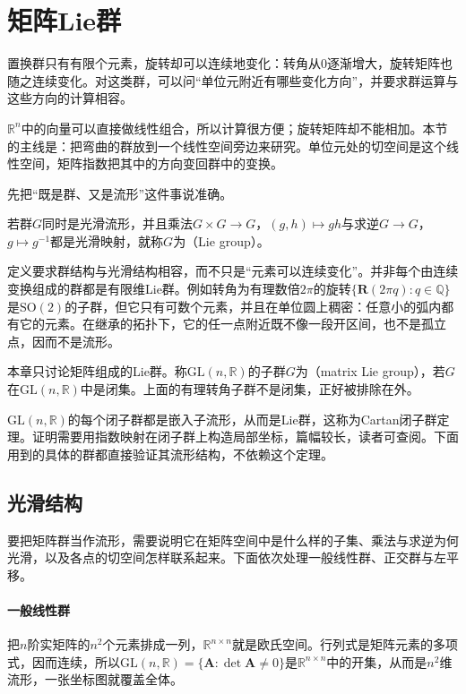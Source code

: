 \section{矩阵Lie群}
\label{sec:lie-matrix-groups}

置换群只有有限个元素，旋转却可以连续地变化：转角从$0$逐渐增大，旋转矩阵也随之连续变化。对这类群，可以问“单位元附近有哪些变化方向”，并要求群运算与这些方向的计算相容。

$\mathbb R^n$中的向量可以直接做线性组合，所以计算很方便；旋转矩阵却不能相加。本节的主线是：把弯曲的群放到一个线性空间旁边来研究。单位元处的切空间是这个线性空间，矩阵指数把其中的方向变回群中的变换。

先把“既是群、又是流形”这件事说准确。

\begin{definition}[Lie群]
\label{def:lie-lie-group}
若群$G$同时是光滑流形，并且乘法$G\times G\to G$，$(g,h)\mapsto gh$与求逆$G\to G$，$g\mapsto g^{-1}$都是光滑映射，就称$G$为（Lie group）。
\end{definition}

定义要求群结构与光滑结构相容，而不只是“元素可以连续变化”。并非每个由连续变换组成的群都是有限维Lie群。例如转角为有理数倍$2\pi$的旋转$\{\bm R(2\pi q):q\in\mathbb Q\}$是$\mathrm{SO}(2)$的子群，但它只有可数个元素，并且在单位圆上稠密：任意小的弧内都有它的元素。在继承的拓扑下，它的任一点附近既不像一段开区间，也不是孤立点，因而不是流形。

本章只讨论矩阵组成的Lie群。称$\mathrm{GL}(n,\mathbb R)$的子群$G$为（matrix Lie group），若$G$在$\mathrm{GL}(n,\mathbb R)$中是闭集。上面的有理转角子群不是闭集，正好被排除在外。

$\mathrm{GL}(n,\mathbb R)$的每个闭子群都是嵌入子流形，从而是Lie群，这称为Cartan闭子群定理。证明需要用指数映射在闭子群上构造局部坐标，篇幅较长，读者可查阅。下面用到的具体的群都直接验证其流形结构，不依赖这个定理。

\subsection{光滑结构}
\label{sec:lie-smooth-structure}

要把矩阵群当作流形，需要说明它在矩阵空间中是什么样的子集、乘法与求逆为何光滑，以及各点的切空间怎样联系起来。下面依次处理一般线性群、正交群与左平移。

\paragraph{一般线性群}
把$n$阶实矩阵的$n^2$个元素排成一列，$\mathbb R^{n\times n}$就是欧氏空间。行列式是矩阵元素的多项式，因而连续，所以$\mathrm{GL}(n,\mathbb R)=\{\bm A:\det\bm A\neq0\}$是$\mathbb R^{n\times n}$中的开集，从而是$n^2$维流形，一张坐标图就覆盖全体。

